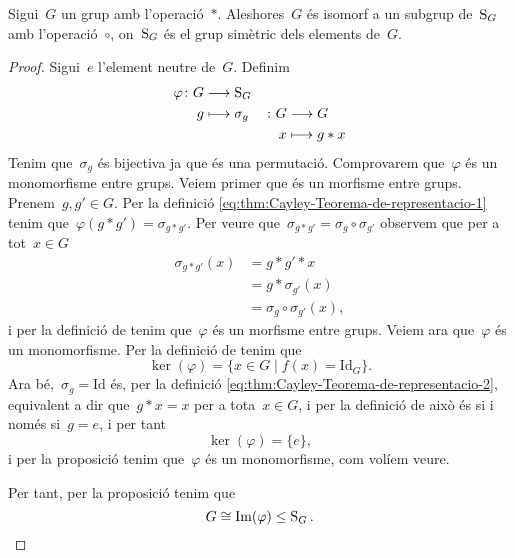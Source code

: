 \documentclass[../estructures-algebraiques.tex]{subfiles}
\begin{document}
    \begin{theorem}
        \label{thm:Cayley-Teorema-de-representacio}
        Sigui~\(G\) un grup amb l'operació~\(\ast\).
        Aleshores~\(G\) és isomorf a un subgrup de~\(\operatorname{S}_{G}\) amb l'operació~\(\circ\), on~\(\operatorname{S}_{G}\) és el grup simètric dels elements de~\(G\).
    \end{theorem}
    \begin{proof}
        Sigui~\(e\) l'element neutre de~\(G\).
        Definim
        \begin{alignat}{2}
        \varphi\colon G&\longrightarrow\operatorname{S}_{G}&&\label{eq:thm:Cayley-Teorema-de-representacio-1}\\
        g&\longmapsto\sigma_{g}&\colon G&\longrightarrow G\label{eq:thm:Cayley-Teorema-de-representacio-2}\\
        &&x&\longmapsto g\ast x\nonumber
        \end{alignat}
        Tenim que~\(\sigma_{g}\) és bijectiva ja que és una permutació.
        Comprovarem que~\(\varphi\) és un monomorfisme entre grups.
        Veiem primer que és un morfisme entre grups.
        Prenem~\(g,g'\in G\).
        Per la definició \eqref{eq:thm:Cayley-Teorema-de-representacio-1} tenim que~\(\varphi(g\ast g')=\sigma_{g\ast g'}\).
        Per veure que~\(\sigma_{g\ast g'}=\sigma_{g}\circ\sigma_{g'}\) observem que per a tot~\(x\in G\)
        \begin{align*}
        \sigma_{g\ast g'}(x)&=g\ast g'\ast x\\
        &=g\ast\sigma_{g'}(x)\\
        &=\sigma_{g}\circ\sigma_{g'}(x),
        \end{align*}
        i per la definició de  tenim que~\(\varphi\) és un morfisme entre grups.
        Veiem ara que~\(\varphi\) és un monomorfisme.
        Per la definició de  tenim que
        \[
            \ker(\varphi)=\{x\in G\mid f(x)=\text{Id}_{G}\}.
        \]
        Ara bé,~\(\sigma_{g}=\text{Id}\) és, per la definició \eqref{eq:thm:Cayley-Teorema-de-representacio-2}, equivalent a dir que~\(g\ast x=x\) per a tota~\(x\in G\), i per la definició de  això és si i només si~\(g=e\), i per tant
        \[
            \ker(\varphi)=\{e\},
        \]
        i per la proposició  tenim que~\(\varphi\) és un monomorfisme, com volíem veure.

        Per tant, per la proposició  tenim que
        \[
            G\cong \operatorname{Im}(\varphi)\leq\operatorname{S}_{G}.\qedhere
        \]
    \end{proof}
\end{document}
